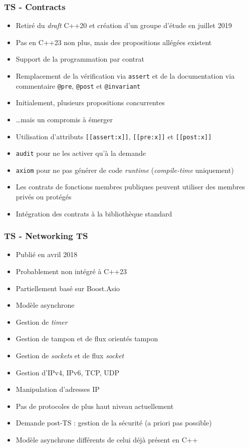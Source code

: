 \documentclass[C++.tex]{subfiles}
\begin{document}
\begin{frame}[fragile]
	\frametitle{TS - Contracts}
	\begin{itemize}
		\item Retiré du \textit{draft} C++20 et création d'un groupe d'étude en juillet 2019
		\item Pas en C++23 non plus, mais des propositions allégées existent
		\item Support de la programmation par contrat
		\item Remplacement de la vérification via \lstinline|assert| et de la documentation via commentaire \lstinline|@pre|, \lstinline|@post| et \lstinline|@invariant|
		\item Initialement, plusieurs propositions \og concurrentes\fg{}
		\item \ldots{}mais un compromis à émerger
		\item Utilisation d'attributs \lstinline|[[assert:x]]|, \lstinline|[[pre:x]]| et \lstinline|[[post:x]]|


		\item \lstinline|audit| pour ne les activer qu'à la demande
		\item \lstinline|axiom| pour ne pas générer de code \textit{runtime} (\textit{compile-time} uniquement)
		\item Les contrats de fonctions membres publiques peuvent utiliser des membres privés ou protégés
		\item Intégration des contrats à la bibliothèque standard
	\end{itemize}
\end{frame}

\begin{frame}
	\frametitle{TS - Networking TS}
	\begin{itemize}
		\item Publié en avril 2018
		\item Probablement non intégré à C++23
		\item Partiellement basé sur Boost.Asio
		\item Modèle asynchrone
		\item Gestion de \textit{timer}
		\item Gestion de tampon et de flux orientés tampon
		\item Gestion de \textit{sockets} et de flux \og \textit{socket}\fg{}
		\item Gestion d'IPv4, IPv6, TCP, UDP
		\item Manipulation d'adresses IP
		\item Pas de protocoles de plus haut niveau actuellement
		\item Demande post-TS : gestion de la sécurité (a priori pas possible)
		\item Modèle asynchrone différents de celui déjà présent en C++
	\end{itemize}
\end{frame}
\end{document}
